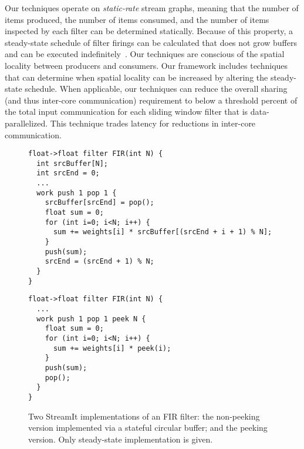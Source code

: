Our techniques operate on {\it static-rate} stream graphs, meaning
that the number of items produced, the number of items consumed, and
the number of items inspected by each filter can be determined
statically.  Because of this property, a steady-state schedule of
filter firings can be calculated that does not grow buffers and can be
executed indefinitely~\cite{lee87}.  Our techniques are conscious of
the spatial locality between producers and consumers.  Our framework
includes techniques that can determine when spatial locality can be
increased by altering the steady-state schedule.  When applicable, our
techniques can reduce the overall sharing (and thus inter-core
communication) requirement to below a threshold percent of the total
input communication for each sliding window filter that is
data-parallelized.  This technique trades latency for reductions in
inter-core communication.

\begin{figure}[t]
\centering
\begin{subfloat}
\begin{minipage}[b]{0.45\textwidth}
\eightpoint
\begin{verbatim}
float->float filter FIR(int N) {
  int srcBuffer[N];
  int srcEnd = 0; 
  ...
  work push 1 pop 1 {
    srcBuffer[srcEnd] = pop();
    float sum = 0;
    for (int i=0; i<N; i++) {
      sum += weights[i] * srcBuffer[(srcEnd + i + 1) % N];
    }
    push(sum);
    srcEnd = (srcEnd + 1) % N;
  }
}
\end{verbatim}
\vspace{-8pt}
\end{minipage}%
\caption{ \label{fig:fir-nopeeking}}
\end{subfloat}%
\qquad
\begin{subfloat}
\begin{minipage}[b]{0.45\textwidth}
\eightpoint
\begin{verbatim}
float->float filter FIR(int N) {
  ...
  work push 1 pop 1 peek N {
    float sum = 0;
    for (int i=0; i<N; i++) {
      sum += weights[i] * peek(i);
    }
    push(sum);
    pop();
  }
}
\end{verbatim}
\vspace{-18pt}
\end{minipage}
\caption{ \label{fig:fir-streamit}}
\end{subfloat}
\caption[Two implementations of an FIR filter.]{\label{fig:fir-code}
  Two StreamIt implementations of an FIR filter:
    the non-peeking version implemented via a
  stateful circular buffer; and  the peeking version. Only steady-state implementation is
  given.}
\end{figure}

